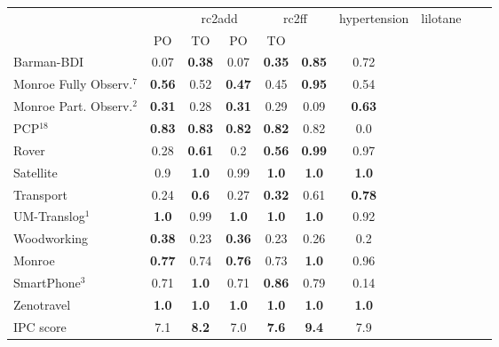 \begin{tabular}{lccccccccccl} 
\toprule 
  && \multicolumn{2}{c}{rc2add} & \multicolumn{2}{c}{rc2ff} & \multicolumn{2}{c}{hypertension} & \multicolumn{2}{c}{lilotane} \\ 
\cmidrule(lr){3-4} \cmidrule(lr){5-6} \cmidrule(lr){7-8} \cmidrule(lr){9-10}  
 &PO & TO & PO & TO  \\ 
\midrule 
Barman-BDI & 0.07 & \textbf{0.38} & 0.07 & \textbf{0.35} & \textbf{0.85} & 0.72  \\ 
Monroe Fully Observ.$^{7}$ & \textbf{0.56} & 0.52 & \textbf{0.47} & 0.45 & \textbf{0.95} & 0.54  \\ 
Monroe Part. Observ.$^{2}$ & \textbf{0.31} & 0.28 & \textbf{0.31} & 0.29 & 0.09 & \textbf{0.63}  \\ 
PCP$^{18}$ & \textbf{0.83} & \textbf{0.83} & \textbf{0.82} & \textbf{0.82} & 0.82 & 0.0  \\ 
Rover & 0.28 & \textbf{0.61} & 0.2 & \textbf{0.56} & \textbf{0.99} & 0.97  \\ 
Satellite & 0.9 & \textbf{1.0} & 0.99 & \textbf{1.0} & \textbf{1.0} & \textbf{1.0}  \\ 
Transport & 0.24 & \textbf{0.6} & 0.27 & \textbf{0.32} & 0.61 & \textbf{0.78}  \\ 
UM-Translog$^{1}$ & \textbf{1.0} & 0.99 & \textbf{1.0} & \textbf{1.0} & \textbf{1.0} & 0.92  \\ 
Woodworking & \textbf{0.38} & 0.23 & \textbf{0.36} & 0.23 & 0.26 & 0.2  \\ 
\midrule 
 Monroe & \textbf{0.77} & 0.74 & \textbf{0.76} & 0.73 & \textbf{1.0} & 0.96  \\ 
SmartPhone$^{3}$ & 0.71 & \textbf{1.0} & 0.71 & \textbf{0.86} & 0.79 & 0.14  \\ 
Zenotravel & \textbf{1.0} & \textbf{1.0} & \textbf{1.0} & \textbf{1.0} & \textbf{1.0} & \textbf{1.0}  \\ 
\midrule 
 IPC score & 7.1 & \textbf{8.2} & 7.0 & \textbf{7.6} & \textbf{9.4} & 7.9  \\ 
\bottomrule 
 \end{tabular} 
